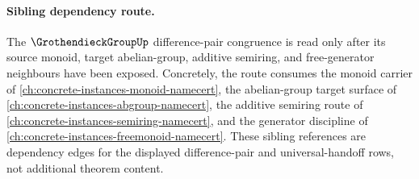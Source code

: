 \paragraph{Sibling dependency route.}
The $\GrothendieckGroupUp$ difference-pair congruence is read only after its
source monoid, target abelian-group, additive semiring, and free-generator
neighbours have been exposed. Concretely, the route consumes the monoid carrier
of \autoref{ch:concrete-instances-monoid-namecert}, the abelian-group target
surface of \autoref{ch:concrete-instances-abgroup-namecert}, the additive
semiring route of \autoref{ch:concrete-instances-semiring-namecert}, and the
generator discipline of \autoref{ch:concrete-instances-freemonoid-namecert}.
These sibling references are dependency edges for the displayed
difference-pair and universal-handoff rows, not additional theorem content.
